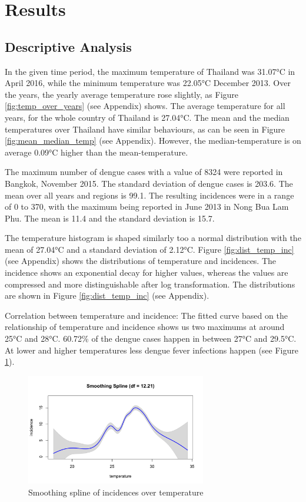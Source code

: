 \section{Results}
	\subsection{Descriptive Analysis}
In the given time period, the maximum temperature of Thailand was 31.07°C in April 2016, while the minimum temperature was 22.05°C December 2013. Over the years, the yearly average temperature rose slightly, as Figure \ref{fig:temp_over_years} (see Appendix) shows. The average temperature for all years, for the whole country of Thailand is 27.04°C.
The mean and the median temperatures over Thailand have similar behaviours, as can be seen in Figure \ref{fig:mean_median_temp} (see Appendix). However, the median-temperature is on average 0.09°C higher than the mean-temperature.

The maximum number of dengue cases with a value of 8324 were reported in Bangkok, November 2015. The standard deviation of dengue cases is 203.6. The mean over all years and regions is 99.1.
The resulting incidences were in a range of 0 to 370, with the maximum being reported in June 2013 in Nong Bua Lam Phu. The mean is 11.4 and the standard deviation is 15.7.

The temperature histogram is shaped similarly too a normal distribution with the mean of 27.04°C and a standard deviation of 2.12°C. Figure \ref{fig:dist_temp_inc} (see Appendix) shows the distributions of temperature and incidences.
The incidence shows an exponential decay for higher values, whereas the values are compressed and more distinguishable after log transformation. The distributions are shown in Figure \ref{fig:dist_temp_inc} (see Appendix). 

Correlation between temperature and incidence:
The fitted curve based on the relationship of temperature and incidence shows us two maximums at around 25°C and 28°C. 60.72\% of the dengue cases happen in between 27°C and 29.5°C. At lower and higher temperatures less dengue fever infections happen (see Figure \ref{fig:smooth_spline}).


\begin{figure}[htbp] 
	\centering
	\includegraphics[width=0.7\textwidth]{fig/Smoothing_spline.png}
	\caption{Smoothing spline of incidences over temperature}
	\label{fig:smooth_spline}
\end{figure}

